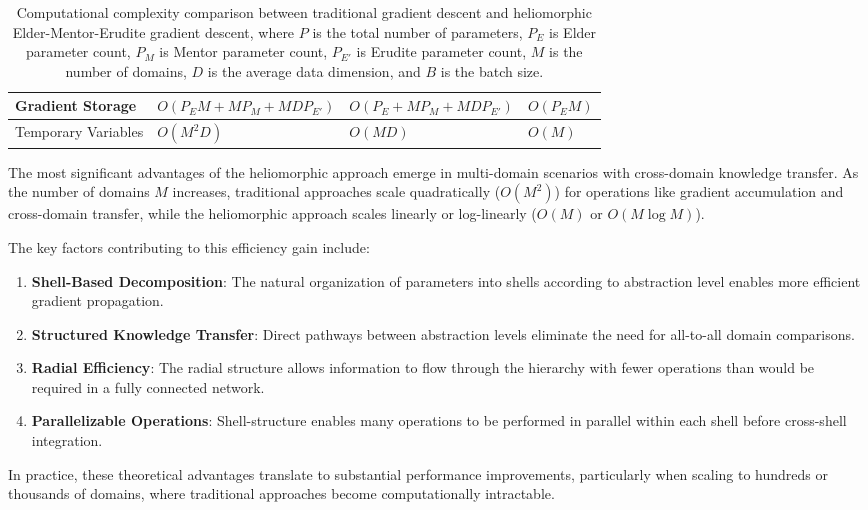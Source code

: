 \begin{table}[h]
\begin{tabular}{|p{3cm}|p{4.5cm}|p{4.5cm}|p{3cm}|}
Gradient Storage & $O(P_E M + MP_M + MD P_{E'})$ & $O(P_E + MP_M + MD P_{E'})$ & $O(P_E M)$ \\
\hline
Temporary Variables & $O(M^2D)$ & $O(MD)$ & $O(M)$ \\
\hline
\end{tabular}
\caption{Computational complexity comparison between traditional gradient descent and heliomorphic Elder-Mentor-Erudite gradient descent, where $P$ is the total number of parameters, $P_E$ is Elder parameter count, $P_M$ is Mentor parameter count, $P_{E'}$ is Erudite parameter count, $M$ is the number of domains, $D$ is the average data dimension, and $B$ is the batch size.}
\label{tab:complexity_comparison}
\end{table}

The most significant advantages of the heliomorphic approach emerge in multi-domain scenarios with cross-domain knowledge transfer. As the number of domains $M$ increases, traditional approaches scale quadratically ($O(M^2)$) for operations like gradient accumulation and cross-domain transfer, while the heliomorphic approach scales linearly or log-linearly ($O(M)$ or $O(M \log M)$).

The key factors contributing to this efficiency gain include:

\begin{enumerate}
    \item \textbf{Shell-Based Decomposition}: The natural organization of parameters into shells according to abstraction level enables more efficient gradient propagation.
    
    \item \textbf{Structured Knowledge Transfer}: Direct pathways between abstraction levels eliminate the need for all-to-all domain comparisons.
    
    \item \textbf{Radial Efficiency}: The radial structure allows information to flow through the hierarchy with fewer operations than would be required in a fully connected network.
    
    \item \textbf{Parallelizable Operations}: Shell-structure enables many operations to be performed in parallel within each shell before cross-shell integration.
\end{enumerate}

In practice, these theoretical advantages translate to substantial performance improvements, particularly when scaling to hundreds or thousands of domains, where traditional approaches become computationally intractable.

